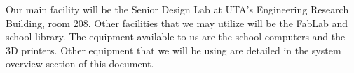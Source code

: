Our main facility will be the Senior Design Lab at UTA's Engineering Research Building, room 208. Other facilities that we may utilize will be the FabLab and school library. The equipment available to us are the school computers and the 3D printers. Other equipment that we will be using are detailed in the system overview section of this document.